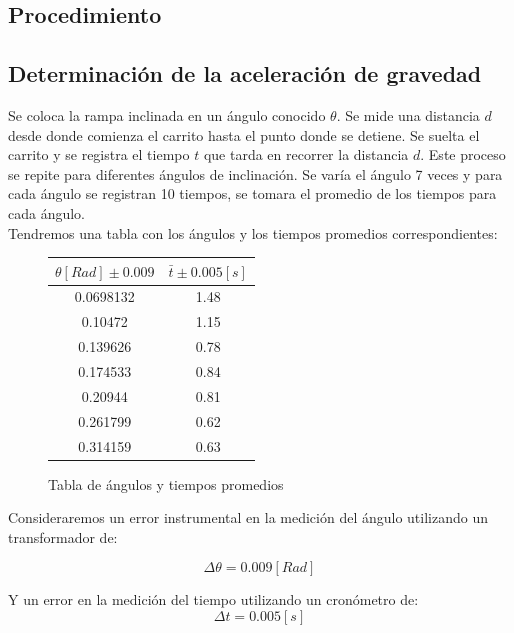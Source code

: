 \documentclass{article}
\begin{document}
\begin{multicols}{2}
\section*{Procedimiento}

\subsection*{Determinación de la aceleración de gravedad}

    Se coloca la rampa inclinada en un ángulo conocido $\theta$. Se mide una distancia $d$ desde
    donde comienza el carrito hasta el punto donde se detiene. Se suelta el carrito y se registra
    el tiempo $t$ que tarda en recorrer la distancia $d$. Este proceso se repite para diferentes
    ángulos de inclinación. Se varía el ángulo 7 veces y para cada ángulo se registran 10 tiempos,
    se tomara el promedio de los tiempos para cada ángulo.
    \\ Tendremos una tabla con los ángulos y los tiempos promedios correspondientes:
    \begin{figure}[H]
    \begin{center}
        \begin{tabular}{|c|c|}
            \hline
            $\theta [Rad] \pm 0.009$ & $\bar{t} \pm 0.005 [s]$ \\
            \hline
            0.0698132 & 1.48 \\
            0.10472 & 1.15 \\
            0.139626 & 0.78 \\
            0.174533 & 0.84 \\
            0.20944 & 0.81 \\
            0.261799 & 0.62 \\
            0.314159 & 0.63 \\
            \hline
        \end{tabular}
    \end{center}
    \caption{Tabla de ángulos y tiempos promedios}
    \end{figure}
    Consideraremos un error instrumental en la medición del ángulo utilizando un transformador 
    de: 
        
        \begin{equation}
            \Delta \theta = 0.009 [Rad]
        \end{equation}
    
    Y un error en la medición del tiempo utilizando un cronómetro de:
        \begin{equation}
            \Delta t = 0.005 [s]
        \end{equation}


\end{multicols}
\end{document}
